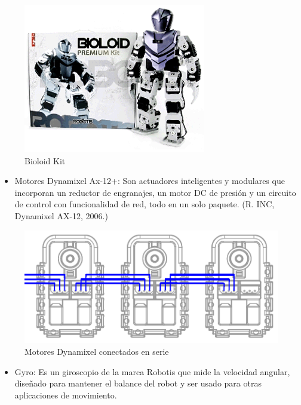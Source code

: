 \begin{figure}[hbtp]

\centering
\includegraphics[scale=0.5]{imagenes/product_bioloid17.png}
\caption{Bioloid Kit}
\end{figure}

\begin{itemize}

\item Motores Dynamixel Ax-12+: Son actuadores inteligentes y modulares que incorporan un reductor de engranajes, un motor DC de presión y un circuito de control con funcionalidad de red, todo en un solo paquete. (R. INC, Dynamixel AX-12, 2006.)
\end{itemize}

\begin{figure}[hbtp]

\centering
\includegraphics[scale=0.5]{imagenes/AX-12_serie.png}
\caption{Motores Dynamixel conectados en serie}
\end{figure}

\begin{itemize}
\item Gyro: Es un giroscopio de la marca Robotis que mide la velocidad angular, diseñado para mantener el balance del robot y ser usado para otras aplicaciones de movimiento. 

\end{itemize}

